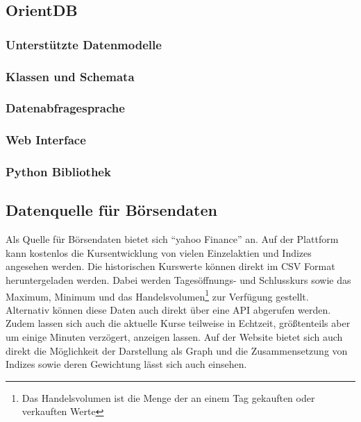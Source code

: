 \subsection{OrientDB}

\subsubsection{Unterstützte Datenmodelle}

\subsubsection{Klassen und Schemata}

\subsubsection{Datenabfragesprache}

\subsubsection{Web Interface}

\subsubsection{Python Bibliothek}

\subsection{Datenquelle für Börsendaten}



Als Quelle für Börsendaten bietet sich \enquote{yahoo Finance} an. Auf der Plattform kann kostenlos die Kursentwicklung von vielen Einzelaktien und Indizes angesehen werden. Die historischen Kurswerte können direkt im \gls{CSV} Format heruntergeladen werden. Dabei werden Tagesöffnungs- und Schlusskurs sowie das Maximum, Minimum und das Handelsvolumen\footnote{Das Handelsvolumen ist die Menge der an einem Tag gekauften oder verkauften Werte} zur Verfügung gestellt. Alternativ können diese Daten auch direkt über eine \gls{API} abgerufen werden. Zudem lassen sich auch die aktuelle Kurse teilweise in Echtzeit, größtenteils aber um einige Minuten verzögert, anzeigen lassen. Auf der Website bietet sich auch direkt die Möglichkeit der Darstellung als Graph und die Zusammensetzung von Indizes sowie deren Gewichtung lässt sich auch einsehen.

\clearpage